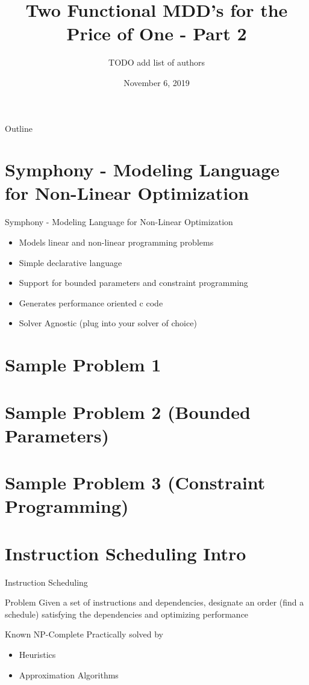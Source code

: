 \documentclass[presentation]{beamer}
\author{TODO add list of authors}
\date{November 6, 2019}
\title{Two Functional MDD's for the Price of One - Part 2}
\begin{document}
\maketitle
\begin{frame}{Outline}
\tableofcontents
\end{frame}


\section{Symphony - Modeling Language for Non-Linear Optimization}
\label{sec:orgb57e87e}
\begin{frame}[label={sec:org30df36c}]{Symphony - Modeling Language for Non-Linear Optimization}
\begin{itemize}
\item Models linear and non-linear programming problems
\item Simple declarative language
\item Support for bounded parameters and constraint programming
\item Generates performance oriented c code
\item Solver Agnostic (plug into your solver of choice)
\end{itemize}
\end{frame}
\section{Sample Problem 1}
\label{sec:orgc7632c9}
\section{Sample Problem 2 (Bounded Parameters)}
\label{sec:orgcc8e741}
\section{Sample Problem 3 (Constraint Programming)}
\label{sec:orgf34d00a}
\section{Instruction Scheduling Intro}
\label{sec:orgec9afbc}
\begin{frame}[label={sec:org2f7d8cc}]{Instruction Scheduling}
\begin{block}{Problem}
Given a set of instructions and dependencies, designate an order 
(find a \alert{schedule}) satisfying the dependencies and optimizing performance
\end{block}
\begin{block}{Known NP-Complete}
Practically solved by
\begin{itemize}
\item \alert{Heuristics}
\item \alert{Approximation Algorithms}
\end{itemize}
\end{block}
\end{frame}
\end{document}
